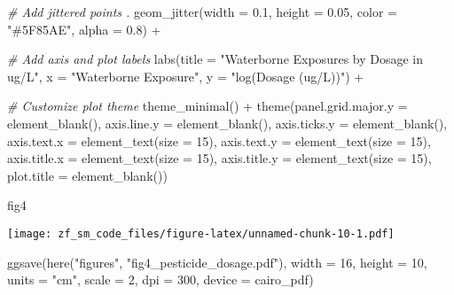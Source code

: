 \documentclass[
]{article}
\newenvironment{Shaded}{\begin{snugshade}}{\end{snugshade}}
\newcommand{\AttributeTok}[1]{\textcolor[rgb]{0.77,0.63,0.00}{#1}}
\newcommand{\CommentTok}[1]{\textcolor[rgb]{0.56,0.35,0.01}{\textit{#1}}}
\newcommand{\DecValTok}[1]{\textcolor[rgb]{0.00,0.00,0.81}{#1}}
\newcommand{\FloatTok}[1]{\textcolor[rgb]{0.00,0.00,0.81}{#1}}
\newcommand{\FunctionTok}[1]{\textcolor[rgb]{0.00,0.00,0.00}{#1}}
\newcommand{\NormalTok}[1]{#1}
\newcommand{\SpecialCharTok}[1]{\textcolor[rgb]{0.00,0.00,0.00}{#1}}
\newcommand{\StringTok}[1]{\textcolor[rgb]{0.31,0.60,0.02}{#1}}
\begin{document}
\begin{Shaded}
\begin{Highlighting}[]
  \CommentTok{\# Add jittered points .}
  \FunctionTok{geom\_jitter}\NormalTok{(}\AttributeTok{width =} \FloatTok{0.1}\NormalTok{, }\AttributeTok{height =} \FloatTok{0.05}\NormalTok{, }\AttributeTok{color =} \StringTok{"\#5F85AE"}\NormalTok{, }\AttributeTok{alpha =} \FloatTok{0.8}\NormalTok{) }\SpecialCharTok{+}

  
  \CommentTok{\# Add axis and plot labels}
  \FunctionTok{labs}\NormalTok{(}\AttributeTok{title =} \StringTok{"Waterborne Exposures by Dosage in ug/L"}\NormalTok{, }\AttributeTok{x =} \StringTok{"Waterborne Exposure"}\NormalTok{, }\AttributeTok{y =} \StringTok{"log(Dosage (ug/L))"}\NormalTok{) }\SpecialCharTok{+}
  
  \CommentTok{\# Customize plot theme}
  \FunctionTok{theme\_minimal}\NormalTok{() }\SpecialCharTok{+}
  \FunctionTok{theme}\NormalTok{(}\AttributeTok{panel.grid.major.y =} \FunctionTok{element\_blank}\NormalTok{(),}
    \AttributeTok{axis.line.y =} \FunctionTok{element\_blank}\NormalTok{(),}
    \AttributeTok{axis.ticks.y =} \FunctionTok{element\_blank}\NormalTok{(),}
    \AttributeTok{axis.text.x =} \FunctionTok{element\_text}\NormalTok{(}\AttributeTok{size =} \DecValTok{15}\NormalTok{),}
    \AttributeTok{axis.text.y =} \FunctionTok{element\_text}\NormalTok{(}\AttributeTok{size =} \DecValTok{15}\NormalTok{),}
    \AttributeTok{axis.title.x =} \FunctionTok{element\_text}\NormalTok{(}\AttributeTok{size =} \DecValTok{15}\NormalTok{),}
    \AttributeTok{axis.title.y =} \FunctionTok{element\_text}\NormalTok{(}\AttributeTok{size =} \DecValTok{15}\NormalTok{),}
    \AttributeTok{plot.title =} \FunctionTok{element\_blank}\NormalTok{())}

\NormalTok{ fig4}
\end{Highlighting}
\end{Shaded}

\texttt{[image: zf\_sm\_code\_files/figure-latex/unnamed-chunk-10-1.pdf]}

\begin{Shaded}
\begin{Highlighting}[]
\FunctionTok{ggsave}\NormalTok{(}\FunctionTok{here}\NormalTok{(}\StringTok{"figures"}\NormalTok{, }\StringTok{"fig4\_pesticide\_dosage.pdf"}\NormalTok{), }\AttributeTok{width =} \DecValTok{16}\NormalTok{, }\AttributeTok{height =} \DecValTok{10}\NormalTok{, }\AttributeTok{units =} \StringTok{"cm"}\NormalTok{, }\AttributeTok{scale =} \DecValTok{2}\NormalTok{, }\AttributeTok{dpi =} \DecValTok{300}\NormalTok{, }\AttributeTok{device =}\NormalTok{ cairo\_pdf)}
\end{Highlighting}
\end{Shaded}
\end{document}
